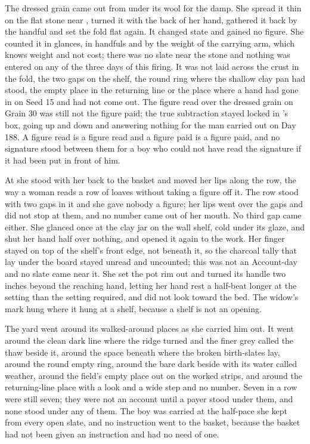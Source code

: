 The dressed grain came out from under its wool for the damp. She spread it thin on the flat stone near , turned it with the back of her hand, gathered it back by the handful and set the fold flat again. It changed state and gained no figure. She counted it in glances, in handfuls and by the weight of the carrying arm, which knows weight and not cost; there was no slate near the stone and nothing was entered on any of the three days of this firing. It was not laid across the crust in the fold, the two gaps on the shelf, the round ring where the shallow clay pan had stood, the empty place in the returning line or the place where a hand had gone in on Seed 15 and had not come out. The figure read over the dressed grain on Grain 30 was still not the figure paid; the true subtraction stayed locked in 's box, going up and down  and answering nothing for the man carried out on Day 188. A figure read is a figure read and a figure paid is a figure paid, and no signature stood between them for a boy who could not have read the signature if it had been put in front of him.

At  she stood with her back to the basket and moved her lips along the row, the way a woman reads a row of loaves without taking a figure off it. The row stood with two gaps in it and she gave nobody a figure; her lips went over the gaps and did not stop at them, and no number came out of her mouth. No third gap came either. She glanced once at the clay jar on the wall shelf, cold under its glaze, and shut her hand half over nothing, and opened it again to the work. Her finger stayed on top of the shelf's front edge, not beneath it, so the charcoal tally that lay under the board stayed unread and uncounted; this was not an Account-day and no slate came near it. She set the pot rim out and turned its handle two inches beyond the reaching hand, letting her hand rest a half-beat longer at the setting than the setting required, and did not look toward the bed. The widow's mark hung where it hung at a shelf, because a shelf is not an opening.

The yard went around its walked-around places as she carried him out. It went around the clean dark line where the  ridge turned and the finer grey called the thaw beside it, around the space beneath  where the broken birth-slates lay, around the round empty ring, around the bare dark  beside  with its water called weather, around the field's empty place out on the worked strips, and around the returning-line place with a look and a wide step and no number. Seven in a row were still seven; they were not an account until a payer stood under them, and none stood under any of them. The boy was carried at the half-pace she kept from every open slate, and no instruction went to the basket, because the basket had not been given an instruction and had no need of one.

